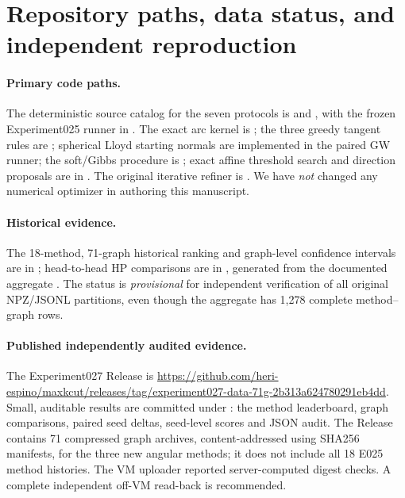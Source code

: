 \section{Repository paths, data status, and independent reproduction}\label{app:repro}
\paragraph{Primary code paths.}
The deterministic source catalog for the seven protocols is  and , with the frozen Experiment025 runner in . The exact arc kernel is ; the three greedy tangent rules are ; spherical Lloyd starting normals are implemented in the paired GW runner; the soft/Gibbs procedure is ; exact affine threshold search and direction proposals are in . The original iterative refiner is . We have \emph{not} changed any numerical optimizer in authoring this manuscript.

\paragraph{Historical evidence.}
The 18-method, 71-graph historical ranking and graph-level confidence intervals are in ; head-to-head HP comparisons are in , generated from the documented aggregate . The status is \emph{provisional} for independent verification of all original NPZ/JSONL partitions, even though the aggregate has 1,278 complete method--graph rows.

\paragraph{Published independently audited evidence.}
The Experiment027 Release is \url{https://github.com/heri-espino/maxkcut/releases/tag/experiment027-data-71g-2b313a624780291eb4dd}. Small, auditable results are committed under
: the method leaderboard, graph comparisons, paired seed deltas, seed-level scores and JSON audit. The Release contains 71 compressed graph archives, content-addressed using SHA256 manifests, for the three new angular methods; it does not include all 18 E025 method histories. The VM uploader reported server-computed digest checks. A complete independent off-VM read-back is recommended.

